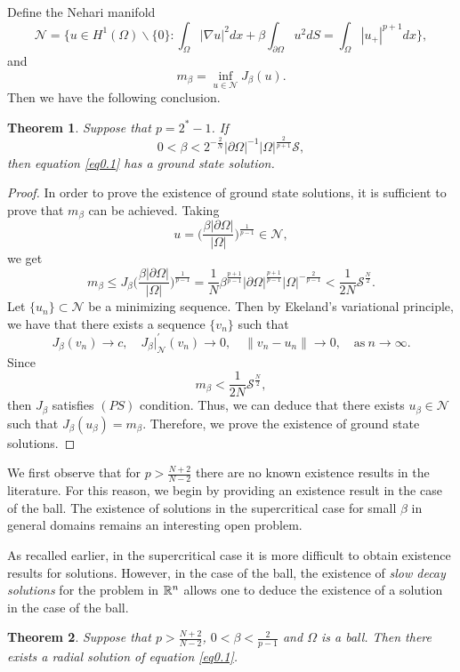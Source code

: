 \documentclass[12pt,reqno]{amsart}
\numberwithin{equation}{section}
\newtheorem{theorem}{Theorem}[section]
\theoremstyle{definition}
\def\R{{\Bbb R}}
\begin{document}
Define the Nehari manifold 
$$
\mathcal{N}=\Big\{ u\in H^1(\Omega)\backslash\{0\} : \int_{\Omega}|\nabla u|^2dx+\beta\int_{\partial\Omega}u^2dS=\int_{\Omega}|u_+|^{p+1}dx\Big\},
$$
and 
$$
m_\beta=\inf_{u\in\mathcal{N}} J_\beta(u).
$$
Then we have the following conclusion.

\begin{theorem}
Suppose that $p=2^*-1$. If 
$$
0<\beta<2^{-\frac{2}{N}}|\partial\Omega|^{-1}|\Omega|^{\frac{2}{p+1}}\mathcal{S},
$$ 
then equation \eqref{eq0.1} has a ground state solution.
\end{theorem}

\begin{proof}
In order to prove the existence of ground state solutions, it is sufficient to prove that $m_\beta$ 
can be achieved. Taking 
$$
u=\Big(\frac{\beta|\partial\Omega|}{|\Omega|}\Big)^{\frac{1}{p-1}}\in \mathcal{N},
$$
we get 
$$
m_\beta\le J_\beta\Big(\frac{\beta|\partial\Omega|}{|\Omega|}\Big)^{\frac{1}{p-1}}=\frac{1}{N}\beta^{\frac{p+1}{p-1}}|\partial\Omega|^{\frac{p+1}{p-1}}|\Omega|^{-\frac{2}{p-1}}<\frac{1}{2N}\mathcal{S}^{\frac{N}{2}}.
$$
Let $\{u_n\}\subset\mathcal{N}$ be a minimizing sequence. Then by Ekeland's variational principle, we have that there exists a sequence $\{v_n\}$ such that 
$$
J_\beta(v_n)\to c,\quad J_\beta|_{\mathcal{N}}^\prime(v_n)\to0,\quad \|v_n-u_n\|\to0,\quad \text{as}\ n\to\infty.
$$
Since 
$$
m_\beta<\frac{1}{2N}\mathcal{S}^{\frac{N}{2}}, 
$$
then $J_\beta$ satisfies $(PS)$ condition. Thus, we can deduce that there exists $u_\beta\in\mathcal{N}$ such that $J_\beta(u_\beta)=m_\beta$. Therefore, we prove the existence of ground state solutions.
\end{proof}

We first observe that for $p>\frac{N+2}{N-2}$ there are no known existence results in the literature. For this reason, we begin by providing an existence result in the case of the ball. The existence of solutions in the supercritical case for small $\beta$ in general domains remains an interesting open problem.

As recalled earlier, in the supercritical case it is more difficult to obtain existence results for solutions. However, in the case of the ball, the existence of {\em slow decay solutions} for the problem in $\R^n$ allows one to deduce the existence of a solution in the case of the ball.

\begin{theorem}
Suppose that $p>\frac{N+2}{N-2}$, $0<\beta<\frac{2}{p-1}$ and $\Omega$ is a ball.  Then there exists a radial solution of equation \eqref{eq0.1}.
\end{theorem}
\end{document}
